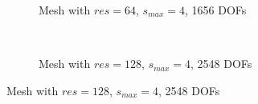 \begin{figure}[H]
    \begin{subfigure}[b]{1\linewidth}
        \centering
        \caption{Mesh with $res=64$, $s_{max}=4$, 1656 DOFs}
    \end{subfigure}
    \\
    \begin{subfigure}[b]{1\linewidth}
        \centering
        \caption{Mesh with $res=128$, $s_{max}=4$, 2548 DOFs}
    \end{subfigure}
\end{figure}

